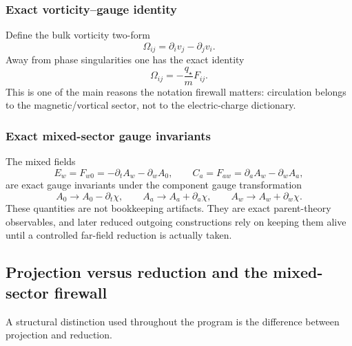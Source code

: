 \documentclass[11pt]{article}
\theoremstyle{definition}
\begin{document}
\subsubsection*{Exact vorticity--gauge identity}

Define the bulk vorticity two-form
\[
\Omega_{ij}=\partial_i v_j-\partial_j v_i.
\]
Away from phase singularities one has the exact identity
\begin{equation}
\Omega_{ij}=-\frac{q_\star}{m}F_{ij}.
\label{eq:vorticity-gauge}
\end{equation}
This is one of the main reasons the notation firewall matters: circulation belongs to the magnetic/vortical sector, not to the electric-charge dictionary.

\subsubsection*{Exact mixed-sector gauge invariants}

The mixed fields
\begin{equation}
E_w=F_{w0}=-\partial_tA_w-\partial_wA_0,
\qquad
C_a=F_{aw}=\partial_aA_w-\partial_wA_a,
\label{eq:mixed-invariants}
\end{equation}
are exact gauge invariants under the component gauge transformation
\[
A_0\to A_0-\partial_t\chi,
\qquad
A_a\to A_a+\partial_a\chi,
\qquad
A_w\to A_w+\partial_w\chi.
\]
These quantities are not bookkeeping artifacts. They are exact parent-theory observables, and later reduced outgoing constructions rely on keeping them alive until a controlled far-field reduction is actually taken.

\subsection{Projection versus reduction and the mixed-sector firewall}

A structural distinction used throughout the program is the difference between projection and reduction.
\end{document}
